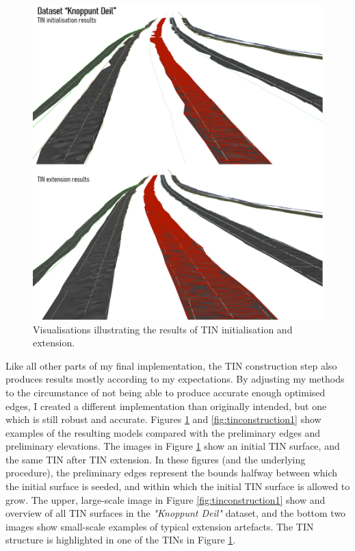 \begin{figure}[]
    \centering
    \includegraphics[width=0.9\linewidth]{final_report/figs/tinconstruction0.png}
    \caption{Visualisations illustrating the results of TIN initialisation and extension.}
    \label{fig:tinconstruction0}
\end{figure}

Like all other parts of my final implementation, the TIN construction step also produces results mostly according to my expectations. By adjusting my methods to the circumstance of not being able to produce accurate enough optimised edges, I created a different implementation than originally intended, but one which is still robust and accurate. Figures \ref{fig:tinconstruction0} and \ref{fig:tinconstruction1} show examples of the resulting models compared with the preliminary edges and preliminary elevations. The images in Figure \ref{fig:tinconstruction0} show an initial TIN surface, and the same TIN after TIN extension. In these figures (and the underlying procedure), the preliminary edges represent the bounds halfway between which the initial surface is seeded, and within which the initial TIN surface is allowed to grow. The upper, large-scale image in Figure \ref{fig:tinconstruction1} show and overview of all TIN surfaces in the \textit{"Knoppunt Deil"} dataset, and the bottom two images show small-scale examples of typical extension artefacts. The TIN structure is highlighted in one of the TINs in Figure \ref{fig:tinconstruction0}.

